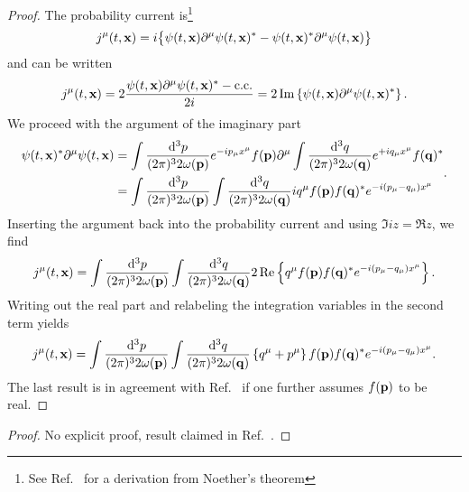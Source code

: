 \begin{proof}
	The probability current is\footnote{See Ref.~\cite[p.~18]{Peskin1995} for a derivation from Noether's theorem}
	\begin{equation*}
		j^\mu(t,\vb{x})
		=
		i
		\bigl\{
			\psi(t,\vb{x})
			\partial^\mu
			\psi(t,\vb{x})^*
			-
			\psi(t,\vb{x})^*
			\partial^\mu
			\psi(t,\vb{x})
		\bigr\}
	\end{equation*}
	and can be written
	\begin{equation*}
		j^\mu(t,\vb{x})
		=
		2\frac{\psi(t,\vb{x})\partial^\mu\psi(t,\vb{x})^*-\text{c.c.}}{2i}
		=
		2\operatorname{\operatorname{Im}}\left\{
			\psi(t,\vb{x})
			\partial^\mu
			\psi(t,\vb{x})^*
		\right\}
		.
	\end{equation*}
	We proceed with the argument of the imaginary part
	\begin{equation*}
		\begin{split}
			\psi(t,\vb{x})^*
			\partial^\mu
			\psi(t,\vb{x})
			&=
			\int\frac{\dd[3]{p}}{(2\pi)^32\omega(\vb{p})}
			e^{-ip_\mu x^\mu}
			f(\vb{p})
			\partial^\mu
			\int\frac{\dd[3]{q}}{(2\pi)^32\omega(\vb{q})}
			e^{+iq_\mu x^\mu}
			f(\vb{q})^*
			\\
			&=
			\int\frac{\dd[3]{p}}{(2\pi)^32\omega(\vb{p})}
			\int\frac{\dd[3]{q}}{(2\pi)^32\omega(\vb{q})}
			iq^\mu
			f(\vb{p})
			f(\vb{q})^*
			e^{-i(p_\mu-q_\mu)x^\mu}
		\end{split}
		.
	\end{equation*}
	Inserting the argument back into the probability current and using $\Im{iz}=\Re{z}$, we find
	\begin{equation*}
		j^\mu(t,\vb{x})
		=
		\int\frac{\dd[3]{p}}{(2\pi)^32\omega(\vb{p})}
		\int\frac{\dd[3]{q}}{(2\pi)^32\omega(\vb{q})}
		2\operatorname{\operatorname{Re}}\left\{
			q^\mu
			f(\vb{p})
			f(\vb{q})^*
			e^{-i(p_\mu-q_\mu)x^\mu}
		\right\}
		.
	\end{equation*}
	Writing out the real part and relabeling the integration variables in the second term yields
	\begin{equation*}
		j^\mu(t,\vb{x})
		=
		\int\frac{\dd[3]{p}}{(2\pi)^32\omega(\vb{p})}
		\int\frac{\dd[3]{q}}{(2\pi)^32\omega(\vb{q})}
		\left\{
			q^\mu
			+
			p^\mu
		\right\}
		f(\vb{p})
		f(\vb{q})^*
		e^{-i(p_\mu-q_\mu)x^\mu}
		.
	\end{equation*}	
	The last result is in agreement with Ref.~\cite[eqs.~36,37]{Naumov2013} if one further assumes $f(\vb{p})$ to be real.
\end{proof}
\qkgsinglelocalization
\begin{proof}
	No explicit proof, result claimed in Ref.~\cite[eq.~38]{Naumov2013}.
\end{proof}

